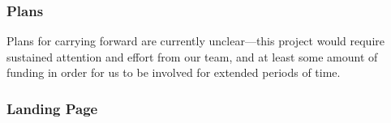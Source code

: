 \subsubsection{Plans}

Plans for carrying forward are currently unclear---this project would require sustained attention and effort from our team, and at least some amount of funding in order for us to be involved for extended periods of time.

\subsubsection{Landing Page}

